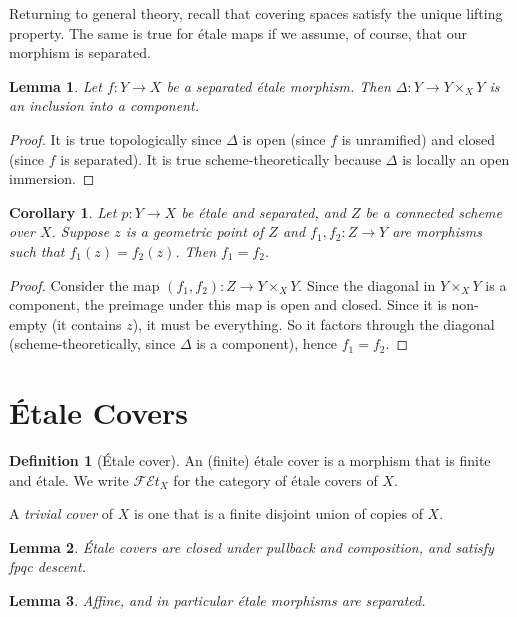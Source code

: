 \documentclass{shortart}
\newtheorem*{lemma}{Lemma}
\newtheorem*{cor}{Corollary}
\theoremstyle{definition}
\newtheorem*{defi}{Definition}
\newcommand\FEt[1]{\mathscr{FE}t_{#1}}
\begin{document}
Returning to general theory, recall that covering spaces satisfy the unique lifting property. The same is true for \'etale maps if we assume, of course, that our morphism is separated.
\begin{lemma}
  Let $f: Y \to X$ be a separated \'etale morphism. Then $\Delta: Y \to Y \times_X Y$ is an inclusion into a component.
\end{lemma}

\begin{proof}
  It is true topologically since $\Delta$ is open (since $f$ is unramified) and closed (since $f$ is separated). It is true scheme-theoretically because $\Delta$ is locally an open immersion.
\end{proof}

\begin{cor}
  Let $p: Y \to X$ be \'etale and separated, and $Z$ be a connected scheme over $X$. Suppose $z$ is a geometric point of $Z$ and $f_1, f_2: Z \to Y$ are morphisms such that $f_1(z) = f_2(z)$. Then $f_1 = f_2$.
\end{cor}

\begin{proof}
  Consider the map $(f_1, f_2): Z \to Y \times_X Y$. Since the diagonal in $Y \times_X Y$ is a component, the preimage under this map is open and closed. Since it is non-empty (it contains $z$), it must be everything. So it factors through the diagonal (scheme-theoretically, since $\Delta$ is a component), hence $f_1 = f_2$.
\end{proof}
\ifplastex\else
\newpage
\fi
\section{\'Etale Covers}
\begin{defi}[\'Etale cover]
  An (finite) \'etale cover is a morphism that is finite and \'etale. We write $\FEt{X}$ for the category of \'etale covers of $X$.

  A \emph{trivial cover} of $X$ is one that is a finite disjoint union of copies of $X$.
\end{defi}

\begin{lemma}
  \'Etale covers are closed under pullback and composition, and satisfy fpqc descent.\fakeqed
\end{lemma}

\begin{lemma}
  Affine, and in particular \'etale morphisms are separated.\fakeqed
\end{lemma}
\end{document}
